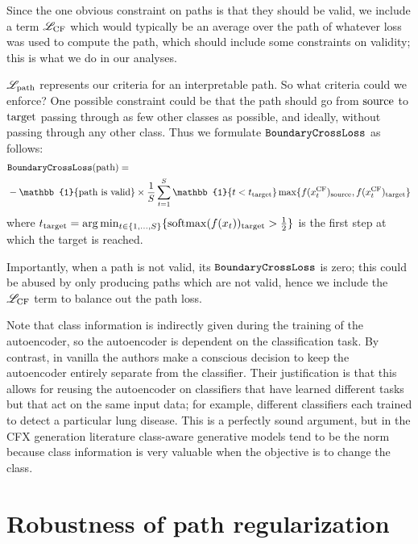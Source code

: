 \documentclass[../main.tex]{subfiles}
\begin{document}
Since the one obvious constraint on paths is that they should be valid, we include a term $\mathscr{L}_\text{CF}$ which would typically be an average over the path of whatever loss was used to compute the path, which should include some constraints on validity; this is what we do in our analyses.

$\mathscr{L}_\text{path}$ represents our criteria for an interpretable path. So what criteria could we enforce?
One possible constraint could be that the path should go from $\mathrm{source}$ to $\mathrm{target}$ passing through as few other classes as possible, and ideally, without passing through any other class.
Thus we formulate $\mathtt{BoundaryCrossLoss}$ as follows:
\begin{align*}
     & \BoundaryCrossLoss(\apath) =                                                                                                                                               \\
     & - \mathbb{1}\{ \apath \text{ is valid}\}
     \times \frac{1}{\nbsteps} \sum_{t=1}^{\nbsteps}
        \mathbb{1}\{ t < t_\target \} \max \{ f(\CF{x}_t)_\source, f(\CF{x}_t)_\target \}
\end{align*}
where $t_{\mathrm{target}} = \arg\min_{t \in \{1, \ldots, S\}} \{ \mathrm{softmax}(f(x_t))_{\mathrm{target}} > \frac{1}{2} \}$ is the first step at which the target is reached.

Importantly, when a path is not valid, its $\mathtt{BoundaryCrossLoss}$ is zero; this could be abused by only producing paths which are not valid, hence we include the $\mathscr{L}_\text{CF}$ term to balance out the path loss.

Note that class information is indirectly given during the training of the autoencoder, so the autoencoder is dependent on the classification task.
By contrast, in vanilla \ls{} the authors make a conscious decision to keep the autoencoder entirely separate from the classifier.
Their justification is that this allows for reusing the autoencoder on classifiers that have learned different tasks but that act on the same input data; for example, different classifiers each trained to detect a particular lung disease.
This is a perfectly sound argument, but in the CFX generation literature class-aware generative models tend to be the norm because class information is very valuable when the objective is to change the class.

\section{Robustness of path regularization}
\label{methods:robustness}
\end{document}
